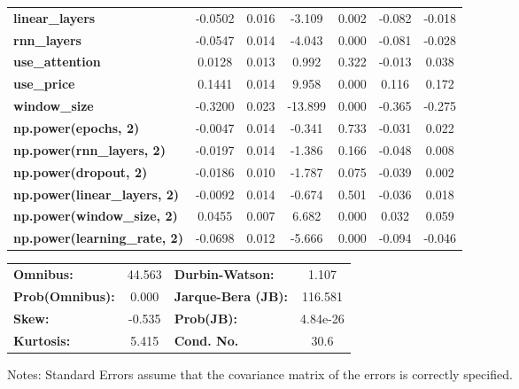 \begin{center}
\begin{tabular}{lcccccc}
\textbf{linear\_layers}              &      -0.0502  &        0.016     &    -3.109  &         0.002        &       -0.082    &       -0.018     \\
\textbf{rnn\_layers}                 &      -0.0547  &        0.014     &    -4.043  &         0.000        &       -0.081    &       -0.028     \\
\textbf{use\_attention}              &       0.0128  &        0.013     &     0.992  &         0.322        &       -0.013    &        0.038     \\
\textbf{use\_price}                  &       0.1441  &        0.014     &     9.958  &         0.000        &        0.116    &        0.172     \\
\textbf{window\_size}                &      -0.3200  &        0.023     &   -13.899  &         0.000        &       -0.365    &       -0.275     \\
\textbf{np.power(epochs, 2)}         &      -0.0047  &        0.014     &    -0.341  &         0.733        &       -0.031    &        0.022     \\
\textbf{np.power(rnn\_layers, 2)}    &      -0.0197  &        0.014     &    -1.386  &         0.166        &       -0.048    &        0.008     \\
\textbf{np.power(dropout, 2)}        &      -0.0186  &        0.010     &    -1.787  &         0.075        &       -0.039    &        0.002     \\
\textbf{np.power(linear\_layers, 2)} &      -0.0092  &        0.014     &    -0.674  &         0.501        &       -0.036    &        0.018     \\
\textbf{np.power(window\_size, 2)}   &       0.0455  &        0.007     &     6.682  &         0.000        &        0.032    &        0.059     \\
\textbf{np.power(learning\_rate, 2)} &      -0.0698  &        0.012     &    -5.666  &         0.000        &       -0.094    &       -0.046     \\
\bottomrule
\end{tabular}
\begin{tabular}{lclc}
\textbf{Omnibus:}       & 44.563 & \textbf{  Durbin-Watson:     } &    1.107  \\
\textbf{Prob(Omnibus):} &  0.000 & \textbf{  Jarque-Bera (JB):  } &  116.581  \\
\textbf{Skew:}          & -0.535 & \textbf{  Prob(JB):          } & 4.84e-26  \\
\textbf{Kurtosis:}      &  5.415 & \textbf{  Cond. No.          } &     30.6  \\
\bottomrule
\end{tabular}
\end{center}

Notes: \newline
 [1] Standard Errors assume that the covariance matrix of the errors is correctly specified.